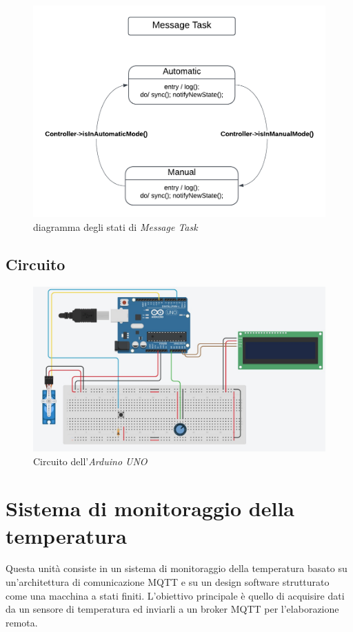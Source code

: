 \documentclass{report}
\begin{document}
\begin{itemize}
{\begin{figure}[H]
        \includegraphics[width=\linewidth]{img/assignment-03/MessageTask.png}
        \caption{diagramma degli stati di \textit{Message Task}}
        \label{fig:message-task}
    \end{figure}
    }
\end{itemize}
%
\section{Circuito}
\begin{figure}[H]
    \centering
    \includegraphics[width=\linewidth]{img/assignment-03/ArduinoCircuit.jpeg}
    \caption{Circuito dell'\textit{Arduino UNO}}
    \label{fig:arduino-circuit}
\end{figure}
%
\chapter{Sistema di monitoraggio della temperatura}
\par{
    Questa unità consiste in un sistema di monitoraggio della temperatura basato su un'architettura di comunicazione MQTT e su un design software strutturato come una macchina a stati finiti. L'obiettivo principale è quello di acquisire dati da un sensore di temperatura ed inviarli a un broker MQTT per l'elaborazione remota.
}
\end{document}
